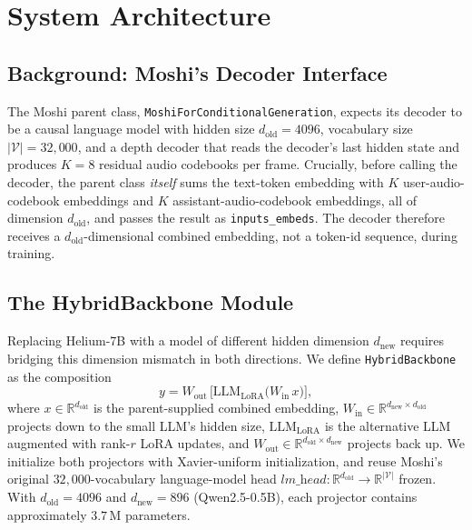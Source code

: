 \documentclass[conference]{IEEEtran}
\begin{document}
\section{System Architecture}
\label{sec:arch}

\subsection{Background: Moshi's Decoder Interface}

The Moshi parent class, \texttt{MoshiForConditionalGeneration}, expects its decoder to be a causal language model with hidden size $d_{\text{old}} = 4096$, vocabulary size $|\mathcal{V}| = 32{,}000$, and a depth decoder that reads the decoder's last hidden state and produces $K = 8$ residual audio codebooks per frame. Crucially, before calling the decoder, the parent class \emph{itself} sums the text-token embedding with $K$ user-audio-codebook embeddings and $K$ assistant-audio-codebook embeddings, all of dimension $d_{\text{old}}$, and passes the result as \texttt{inputs\_embeds}. The decoder therefore receives a $d_{\text{old}}$-dimensional combined embedding, not a token-id sequence, during training.

\subsection{The HybridBackbone Module}

Replacing Helium-7B with a model of different hidden dimension $d_{\text{new}}$ requires bridging this dimension mismatch in both directions. We define \texttt{HybridBackbone} as the composition
\begin{equation}
\label{eq:hybrid}
y = W_{\text{out}}\,\big[\text{LLM}_{\text{LoRA}}\big(W_{\text{in}}\,x\big)\big],
\end{equation}
where $x \in \mathbb{R}^{d_{\text{old}}}$ is the parent-supplied combined embedding, $W_{\text{in}} \in \mathbb{R}^{d_{\text{new}} \times d_{\text{old}}}$ projects down to the small LLM's hidden size, $\text{LLM}_{\text{LoRA}}$ is the alternative LLM augmented with rank-$r$ LoRA updates, and $W_{\text{out}} \in \mathbb{R}^{d_{\text{old}} \times d_{\text{new}}}$ projects back up. We initialize both projectors with Xavier-uniform initialization, and reuse Moshi's original $32{,}000$-vocabulary language-model head $\textit{lm\_head}: \mathbb{R}^{d_{\text{old}}} \rightarrow \mathbb{R}^{|\mathcal{V}|}$ frozen. With $d_{\text{old}}=4096$ and $d_{\text{new}}=896$ (Qwen2.5-0.5B), each projector contains approximately $3.7$\,M parameters.
\end{document}
